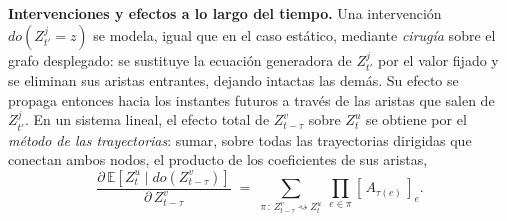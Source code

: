 \documentclass[12pt]{report} %
\begin{document}
\textbf{Intervenciones y efectos a lo largo del tiempo.} Una intervención $do(Z^j_{t'} = z)$ se modela, igual que en el caso estático, mediante \emph{cirugía} sobre el grafo desplegado: se sustituye la ecuación generadora de $Z^j_{t'}$ por el valor fijado y se eliminan sus aristas entrantes, dejando intactas las demás. Su efecto se propaga entonces hacia los instantes futuros a través de las aristas que salen de $Z^j_{t'}$. En un sistema lineal, el efecto total de $Z^v_{t-\tau}$ sobre $Z^u_t$ se obtiene por el \emph{método de las trayectorias}: sumar, sobre todas las trayectorias dirigidas que conectan ambos nodos, el producto de los coeficientes de sus aristas,
\begin{equation}
    \frac{\partial\, \mathbb{E}\!\left[Z^u_t \mid do(Z^v_{t-\tau})\right]}{\partial\, Z^v_{t-\tau}} \;=\; \sum_{\pi\,:\,Z^v_{t-\tau} \rightsquigarrow Z^u_t}\ \prod_{e \in \pi} [\,A_{\tau(e)}\,]_{e}.
    \label{eq:ts_path_method}
\end{equation}
\end{document}
